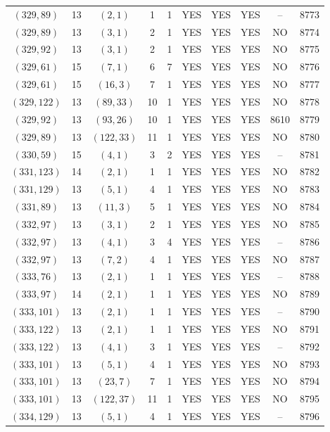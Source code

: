 \begin{longtable}{|c|c|c|c|c|c|c|c|c|c|}
$(329, 89)$ & 13 & $(2, 1)$ & 1 & 1 & YES & YES & YES & -- & 8773\\
$(329, 89)$ & 13 & $(3, 1)$ & 2 & 1 & YES & YES & YES & NO & 8774\\
$(329, 92)$ & 13 & $(3, 1)$ & 2 & 1 & YES & YES & YES & NO & 8775\\
$(329, 61)$ & 15 & $(7, 1)$ & 6 & 7 & YES & YES & YES & NO & 8776\\
$(329, 61)$ & 15 & $(16, 3)$ & 7 & 1 & YES & YES & YES & NO & 8777\\
$(329, 122)$ & 13 & $(89, 33)$ & 10 & 1 & YES & YES & YES & NO & 8778\\
$(329, 92)$ & 13 & $(93, 26)$ & 10 & 1 & YES & YES & YES & 8610 & 8779\\
$(329, 89)$ & 13 & $(122, 33)$ & 11 & 1 & YES & YES & YES & NO & 8780\\
$(330, 59)$ & 15 & $(4, 1)$ & 3 & 2 & YES & YES & YES & -- & 8781\\
$(331, 123)$ & 14 & $(2, 1)$ & 1 & 1 & YES & YES & YES & NO & 8782\\
$(331, 129)$ & 13 & $(5, 1)$ & 4 & 1 & YES & YES & YES & NO & 8783\\
$(331, 89)$ & 13 & $(11, 3)$ & 5 & 1 & YES & YES & YES & NO & 8784\\
$(332, 97)$ & 13 & $(3, 1)$ & 2 & 1 & YES & YES & YES & NO & 8785\\
$(332, 97)$ & 13 & $(4, 1)$ & 3 & 4 & YES & YES & YES & -- & 8786\\
$(332, 97)$ & 13 & $(7, 2)$ & 4 & 1 & YES & YES & YES & NO & 8787\\
$(333, 76)$ & 13 & $(2, 1)$ & 1 & 1 & YES & YES & YES & -- & 8788\\
$(333, 97)$ & 14 & $(2, 1)$ & 1 & 1 & YES & YES & YES & NO & 8789\\
$(333, 101)$ & 13 & $(2, 1)$ & 1 & 1 & YES & YES & YES & -- & 8790\\
$(333, 122)$ & 13 & $(2, 1)$ & 1 & 1 & YES & YES & YES & NO & 8791\\
$(333, 122)$ & 13 & $(4, 1)$ & 3 & 1 & YES & YES & YES & -- & 8792\\
$(333, 101)$ & 13 & $(5, 1)$ & 4 & 1 & YES & YES & YES & NO & 8793\\
$(333, 101)$ & 13 & $(23, 7)$ & 7 & 1 & YES & YES & YES & NO & 8794\\
$(333, 101)$ & 13 & $(122, 37)$ & 11 & 1 & YES & YES & YES & NO & 8795\\
$(334, 129)$ & 13 & $(5, 1)$ & 4 & 1 & YES & YES & YES & -- & 8796\\

\end{longtable}
